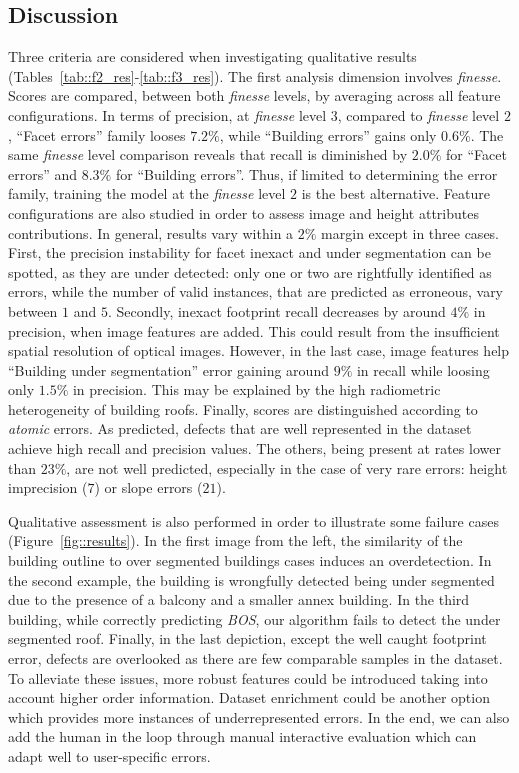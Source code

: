 \documentclass[runningheads]{llncs}
\begin{document}
\subsection{Discussion}

Three criteria are considered when investigating qualitative results (Tables~\ref{tab::f2_res}-\ref{tab::f3_res}). The first analysis dimension involves \textit{finesse}. Scores are compared, between both \textit{finesse} levels, by averaging across all feature configurations. In terms of precision, at \textit{finesse} level $3$, compared to \textit{finesse} level $2$, ``Facet errors'' family looses $7.2\%$, while ``Building errors'' gains only $0.6\%$. The same \textit{finesse} level comparison reveals that recall is diminished by $2.0\%$ for ``Facet errors'' and $8.3\%$ for ``Building errors''. Thus, if limited to determining the error family, training the model at the \textit{finesse} level $2$ is the best alternative. Feature configurations are also studied in order to assess image and height attributes contributions. In general, results vary within a $2\%$ margin except in three cases. First, the precision instability for facet inexact and under segmentation can be spotted, as they are under detected: only one or two are rightfully identified as errors, while the number of valid instances, that are predicted as erroneous, vary between $1$ and $5$. Secondly, inexact footprint recall decreases by around $4\%$ in precision, when image features are added. This could result from the insufficient spatial resolution of optical images. However, in the last case, image features help ``Building under segmentation'' error gaining around $9\%$ in recall while loosing only $1.5\%$ in precision. This may be explained by the high radiometric heterogeneity of building roofs. Finally, scores are distinguished according to \textit{atomic} errors. As predicted, defects that are well represented in the dataset achieve high recall and precision values. The others, being present at rates lower than $23\%$, are not well predicted, especially in the case of very rare errors: height imprecision ($7$) or slope errors ($21$).

Qualitative assessment is also performed in order to illustrate some failure cases (Figure~\ref{fig::results}). In the first image from the left, the similarity of the building outline to over segmented buildings cases induces an overdetection. In the second example, the building is wrongfully detected being under segmented due to the presence of a balcony and a smaller annex building. In the third building, while correctly predicting \textit{BOS}, our algorithm fails to detect the under segmented roof. Finally, in the last depiction, except the well caught footprint error, defects are overlooked as there are few comparable samples in the dataset. To alleviate these issues, more robust features could be introduced taking into account higher order information. Dataset enrichment could be another option which provides more instances of underrepresented errors. In the end, we can also add the human in the loop through manual interactive evaluation which can adapt well to user-specific errors.
\end{document}
